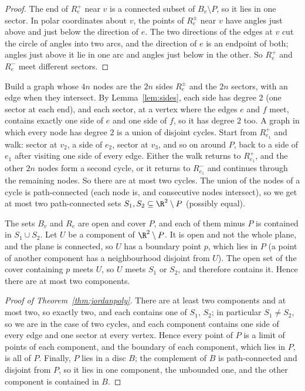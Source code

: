 \begin{proof}
The end of $R_e^+$ near $v$ is a connected subset of $B_v\setminus P$, so it lies in one sector. In polar coordinates about $v$, the points of $R_e^\pm$ near $v$ have angles just above and just below the direction of $e$. The two directions of the edges at $v$ cut the circle of
angles into two arcs, and the direction of $e$ is an endpoint of both; angles just above it lie in one arc and angles just below in the other. So $R_e^+$ and $R_e^-$ meet different sectors.
\end{proof}

Build a graph whose $4n$ nodes are the $2n$ sides $R_e^\pm$ and the $2n$ sectors, with an edge when they intersect. By Lemma~\ref{lem:sides}, each side has degree $2$ (one sector at each end), and each sector, at a vertex where the edges $e$ and $f$ meet, contains exactly one side of $e$ and one side of $f$, so it has degree $2$ too.
A graph in which every node has degree $2$ is a union of disjoint cycles. Start from $R_{e_1}^+$ and walk: sector at $v_2$, a side of $e_2$, sector at $v_3$, and so on around $P$, back to a side of $e_1$ after visiting one side of every edge. Either the walk returns to $R_{e_1}^+$, and the
other $2n$ nodes form a second cycle, or it returns to $R_{e_1}^-$ and continues through the remaining nodes. So there are at most two cycles. The union of the nodes of a cycle is path-connected (each node is, and consecutive nodes intersect), so we get at most two path-connected sets $S_1,S_2\subseteq\R^2\setminus P$ (possibly equal).

The sets $B_v$ and $R_e$ are open and cover $P$, and each of them minus $P$ is contained in $S_1\cup S_2$. Let $U$ be a component of $\R^2\setminus P$. It is open and not the whole plane, and the plane is connected, so $U$ has a boundary point $p$, which lies in $P$ (a point of another
component has a neighbourhood disjoint from $U$). The open set of the cover containing $p$ meets $U$, so $U$ meets $S_1$ or $S_2$, and therefore contains it. Hence there are at most two components.

\begin{proof}[Proof of Theorem~\ref{thm:jordanpoly}]
There are at least two components and at most two, so exactly two, and each contains one of $S_1$, $S_2$; in particular $S_1\ne S_2$, so we are in the case of two cycles, and each component contains one side of every edge and one sector at every vertex. Hence every point of $P$ is a limit
of points of each component, and the boundary of each component, which lies in $P$, is all of $P$. Finally, $P$ lies in a disc $B$; the complement of $B$ is path-connected and disjoint from $P$, so it lies in one component, the unbounded one, and the other component is contained in $B$.
\end{proof}

